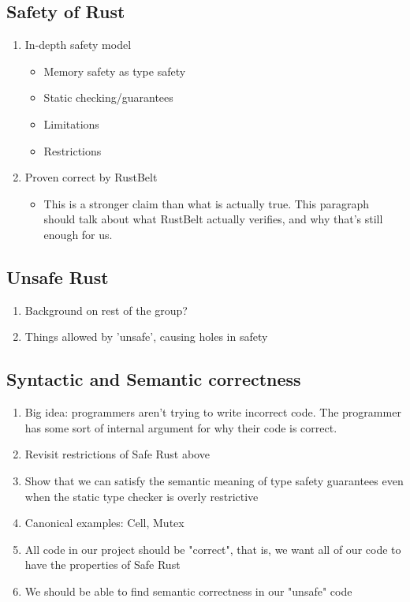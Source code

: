 \documentclass{article}
\begin{document}
\subsection{Safety of Rust}
\begin{enumerate}
    \item In-depth safety model
    \begin{itemize}
        \item Memory safety as type safety
        \item Static checking/guarantees
        \item Limitations
        \item Restrictions
    \end{itemize}
    \item Proven correct by RustBelt
    \begin{itemize}
        \item This is a stronger claim than what is actually true. This paragraph should talk about what RustBelt actually verifies, and why that's still enough for us.
    \end{itemize}
\end{enumerate}

\subsection{Unsafe Rust}
\begin{enumerate}
    \item Background on rest of the group?
    \item Things allowed by 'unsafe', causing holes in safety
\end{enumerate}

\subsection{Syntactic and Semantic correctness}
\begin{enumerate}
    \item Big idea: programmers aren't trying to write incorrect code. The programmer has some sort of internal argument for why their code is correct.
    \item Revisit restrictions of Safe Rust above
    \item Show that we can satisfy the semantic meaning of type safety guarantees even when the static type checker is overly restrictive
    \item Canonical examples: Cell, Mutex
    \item All code in our project should be "correct", that is, we want all of our code to have the properties of Safe Rust
    \item We should be able to find semantic correctness in our "unsafe" code
\end{enumerate}
\end{document}
